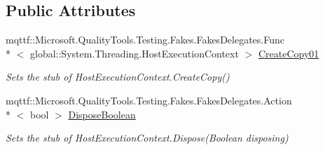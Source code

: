 \subsection*{Public Attributes}
\begin{DoxyCompactItemize}
\item 
mqttf\-::\-Microsoft.\-Quality\-Tools.\-Testing.\-Fakes.\-Fakes\-Delegates.\-Func\\*
$<$ global\-::\-System.\-Threading.\-Host\-Execution\-Context $>$ \hyperlink{class_system_1_1_threading_1_1_fakes_1_1_stub_host_execution_context_af6753f3746c6e603641cba336361e3f0}{Create\-Copy01}
\begin{DoxyCompactList}\small\item\em Sets the stub of Host\-Execution\-Context.\-Create\-Copy()\end{DoxyCompactList}\item 
mqttf\-::\-Microsoft.\-Quality\-Tools.\-Testing.\-Fakes.\-Fakes\-Delegates.\-Action\\*
$<$ bool $>$ \hyperlink{class_system_1_1_threading_1_1_fakes_1_1_stub_host_execution_context_a64ee877f53d4f0f9b0e2a570743f1e71}{Dispose\-Boolean}
\begin{DoxyCompactList}\small\item\em Sets the stub of Host\-Execution\-Context.\-Dispose(\-Boolean disposing)\end{DoxyCompactList}\end{DoxyCompactItemize}
